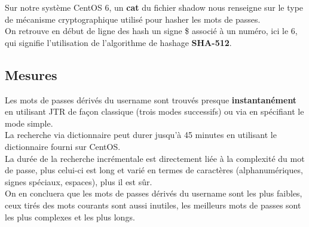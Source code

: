 \documentclass[a4paper,10pt,final,fleqn]{article}
\begin{document}
			Sur notre système CentOS 6, un \textbf{cat} du fichier shadow nous renseigne sur le type de mécanisme cryptographique utilisé pour hasher les mots de passes.\\
			On retrouve en début de ligne des hash un signe \$ associé à un numéro, ici le 6, qui signifie l'utilisation de l'algorithme de hashage \textbf{SHA-512}.\\

		\subsection{Mesures}

			Les mots de passes dérivés du username sont trouvés presque \textbf{instantanément} en utilisant JTR de façon classique (trois modes successifs) ou via en spécifiant le mode simple.\\

			La recherche via dictionnaire peut durer jusqu'à 45 minutes en utilisant le dictionnaire fourni sur CentOS.\\

			La durée de la recherche incrémentale est directement liée à la complexité du mot de passe, plus celui-ci est long et varié en termes de caractères (alphanumériques, signes spéciaux, espaces), plus il est sûr.\\

			On en concluera que les mots de passes dérivés du username sont les plus faibles, ceux tirés des mots courants sont aussi inutiles, les meilleurs mots de passes sont les plus complexes et les plus longs.\\
\end{document}
